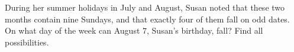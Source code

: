 During her summer holidays in July and August, Susan noted that these two months contain nine Sundays, and that exactly four of them fall on odd dates. On what day of the week can August $7$, Susan's birthday, fall? Find all possibilities.
